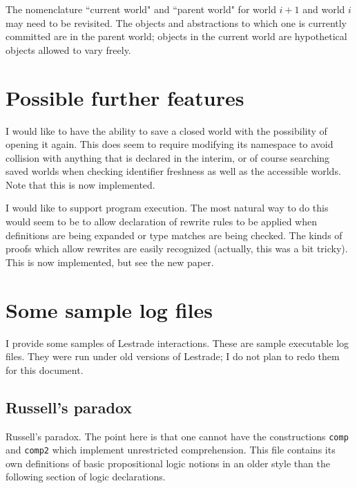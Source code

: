 The nomenclature ``current world" and ``parent world" for world $i+1$ and world $i$ may need to be revisited.   The objects and abstractions to which one is currently committed are in the parent world; objects in the current world are hypothetical objects allowed to vary freely.

\section{Possible further features}

I would like to have the ability to save a closed world with the possibility of opening it again.   This does seem to require modifying its namespace to avoid collision with anything that is
declared in the interim, or of course searching saved worlds when checking identifier freshness as well as the accessible worlds.  Note that this is now implemented.

I would like to support program execution.   The most natural way to do this would seem to be to allow declaration of rewrite rules to be applied when definitions are being expanded
or type matches are being checked.  The kinds of proofs which allow rewrites are easily recognized (actually, this was a bit tricky).  This is now implemented, but see the new paper.

\section{Some sample log files}

I provide some samples of Lestrade interactions.  These are sample executable log files.  They were run under old versions of Lestrade; I do not plan to redo them for this document.



\subsection{Russell's paradox}

Russell's paradox.   The point here is that one cannot have the constructions {\tt comp} and {\tt comp2} which implement unrestricted comprehension.  This file
contains its own definitions of basic propositional logic notions in an older style than the following section of logic declarations.

